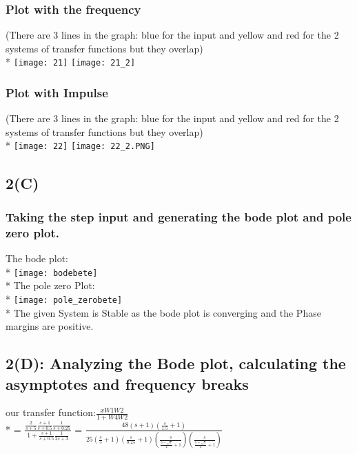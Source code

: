 \documentclass{article}
\begin{document}
\subsubsection{Plot with the frequency}
(There are 3 lines in the graph: blue for the input and yellow and red for the 2 systems of transfer functions but they overlap)\\*
\texttt{[image: 21]}
\texttt{[image: 21\_2]}
\subsubsection{Plot with Impulse}
(There are 3 lines in the graph: blue for the input and yellow and red for the 2 systems of transfer functions but they overlap)\\*
\texttt{[image: 22]}
\texttt{[image: 22\_2.PNG]}
\subsection{2(C)}
\subsubsection{Taking the step input and generating the bode plot and pole zero plot.}
The bode plot:\\*
\texttt{[image: bodebete]}\\*
The pole zero Plot: \\*
\texttt{[image: pole\_zerobete]}\\*
The given System is Stable as the bode plot is converging and the Phase margins are positive. 
\subsection{2(D): Analyzing the Bode plot, calculating the asymptotes and frequency breaks}
our transfer function:${\displaystyle\frac{xW1W2}{1+W4W2}}$\\*
 = $\displaystyle\frac{\frac{2}{s+5}\frac{s+1}{s+0.5}\frac{1}{s+0.25}}{1+\frac{s+1}{s+0.5}\frac{1}{2s+3}}$
 = ${\displaystyle\frac{48 (s+1)(\frac{s}{1.5}+1)}{25(\frac{s}{5}+1)(\frac{s}{0.25}+1)(\frac{s}{\frac{5-\sqrt{5}}{4}+1})(\frac{s}{\frac{5+\sqrt{5}}{4}+1})}} $
 
\end{document}
